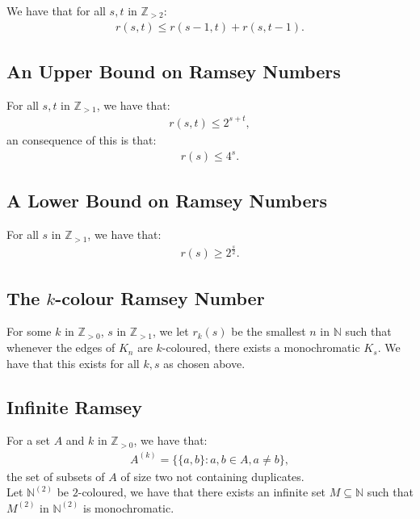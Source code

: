 \documentclass[a4paper, 12pt, twoside]{article}
\begin{document}
We have that for all $s, t$ in $\mathbb{Z}_{> 2}$: \begin{gather*}
  r(s, t) \leq r(s - 1, t) + r(s, t - 1).
\end{gather*}

\subsection{An Upper Bound on Ramsey Numbers}

For all $s, t$ in $\mathbb{Z}_{> 1}$, we have that: \begin{gather*}
  r(s, t) \leq 2^{s + t},
\end{gather*} an consequence of this is that: \begin{gather*}
  r(s) \leq 4^{s}.
\end{gather*}

\subsection{A Lower Bound on Ramsey Numbers}

For all $s$ in $\mathbb{Z}_{> 1}$, we have that: \begin{gather*}
  r(s) \geq 2^{\frac{s}{2}}.
\end{gather*}

\subsection{The $k$-colour Ramsey Number}

For some $k$ in $\mathbb{Z}_{> 0}$, $s$ in $\mathbb{Z}_{> 1}$, we let $r_k(s)$ 
be the smallest $n$ in $\mathbb{N}$ such that whenever the edges of $K_n$ are
$k$-coloured, there exists a monochromatic $K_s$.
We have that this exists for all $k, s$ as chosen above.

\subsection{Infinite Ramsey}

For a set $A$ and $k$ in $\mathbb{Z}_{> 0}$,  we have that: \begin{gather*}
  A^{(k)} = \{\{a, b\} : a, b \in A, a \neq b\},
\end{gather*} the set of subsets of $A$ of size two not containing duplicates.
\\[\baselineskip]
Let $\mathbb{N}^{(2)}$ be $2$-coloured, we have that there exists an infinite set 
$M \subseteq \mathbb{N}$ such that $M^{(2)}$ in $\mathbb{N}^{(2)}$ is monochromatic.
\end{document}
